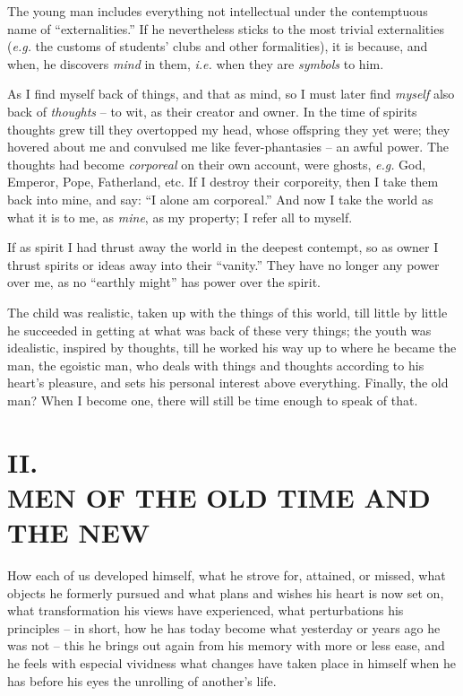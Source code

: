 \documentclass[12pt,a4paper]{book}
\begin{document}
The young man includes everything not intellectual under the contemptuous name 
of ``externalities.'' If he nevertheless sticks to the most trivial 
externalities (\textit{e.g.} the customs of students' clubs and other 
formalities), it is because, and when, he discovers \textit{mind} in them, 
\textit{i.e.} when they are \textit{symbols} to him.

As I find myself back of things, and that as mind, so I must later find 
\textit{myself} also back of \textit{thoughts} -- to wit, as their creator and 
owner. In the time of spirits thoughts grew till they overtopped my head, 
whose offspring they yet were; they hovered about me and convulsed me like 
fever-phantasies -- an awful power. The thoughts had become \textit{corporeal} 
on their own account, were ghosts, \textit{e.g.} God, Emperor, Pope, 
Fatherland, etc. If I destroy their corporeity, then I take them back into 
mine, and say: ``I alone am corporeal.'' And now I take the world as what it 
is to me, as \textit{mine}, as my property; I refer all to myself.

If as spirit I had thrust away the world in the deepest contempt, so as owner 
I thrust spirits or ideas away into their ``vanity.'' They have no longer 
any power over me, as no ``earthly might'' has power over the spirit.

The child was realistic, taken up with the things of this world, till little 
by little he succeeded in getting at what was back of these very things; the 
youth was idealistic, inspired by thoughts, till he worked his way up to where 
he became the man, the egoistic man, who deals with things and thoughts 
according to his heart's pleasure, and sets his personal interest above 
everything. Finally, the old man? When I become one, there will still be time 
enough to speak of that.

\chapter[II. Men Of The Old And The New]{\centering II.\\
MEN OF THE OLD TIME AND THE NEW}

\medskip{}

\noindent{}How each of us developed himself, what he strove for, attained, or 
missed, what objects he formerly pursued and what plans and wishes his heart 
is now set on, what transformation his views have experienced, what 
perturbations his principles -- in short, how he has today become what 
yesterday or years ago he was not -- this he brings out again from his memory 
with more or less ease, and he feels with especial vividness what changes have 
taken place in himself when he has before his eyes the unrolling of another's 
life.
\end{document}

